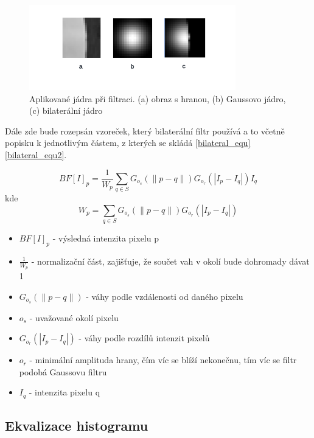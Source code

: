 \newpage
\begin{figure}[h]
	\centering
	\includegraphics[width=0.8\textwidth]{obrazky/bilateral_kernel.png}
	\caption{Aplikované jádra při filtraci. (a) obraz s hranou, (b) Gaussovo jádro, (c) bilaterální jádro \cite{bilateral_kernel}}
	\label{ukazka_jader}
\end{figure}


Dále zde bude rozepsán vzoreček, který bilaterální filtr používá a to včetně popisku k jednotlivým částem, z kterých se skládá \ref{bilateral_equ} \ref{bilateral_equ2}.

\begin{equation}
    BF[I]_{p} = \frac{1}{W_{p}} \sum_{q \in S} G_{o_{s}} (\| p - q \|) G_{o_{r}} (|I_{p} - I_{q}|) I_{q}
    \label{bilateral_equ}
\end{equation}
kde 
\begin{equation}
    W_{p} =  \sum_{q \in S} G_{o_{s}} (\| p - q \|) G_{o_{r}} (|I_{p} - I_{q}|)
    \label{bilateral_equ2}
\end{equation}

    
\begin{itemize}
    \item $BF[I]_{p}$ - výsledná intenzita pixelu p
    \item $\frac{1}{W_{p}}$ - normalizační část, zajišťuje, že součet vah v okolí bude dohromady dávat 1 
    \item $G_{o_{s}} (\| p - q \|)$ - váhy podle vzdálenosti od daného pixelu
    \item $o_{s}$ - uvažované okolí pixelu
    \item $G_{o_{r}} (|I_{p} - I_{q}|)$ - váhy podle rozdílů intenzit pixelů
    \item $o_{r}$ - minimální amplituda hrany, čím víc se blíží nekonečnu, tím víc se filtr podobá Gaussovu filtru
    \item $I_{q}$ - intenzita pixelu q
\end{itemize}


\subsection{Ekvalizace histogramu}
\label{ekvalizace_chapter}

